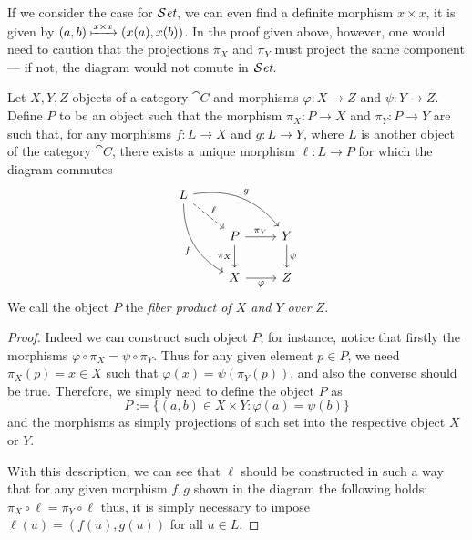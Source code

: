 If we consider the case for \({\mathcal{S}\textit{et}}\), we can even find a definite morphism \(x
\times x\), it is given by \((a, b) \xmapsto{x \times x} (x(a), x(b))\). In the
proof given above, however, one would need to caution that the projections
\(\pi_X\) and \(\pi_Y\) must project the same component --- if not, the diagram
would not comute in \({\mathcal{S}\textit{et}}\).

\begin{proposition}
   Let \(X, Y, Z\) objects of a category \(\cat C\) and morphisms \(\varphi :X
   \to Z\) and \(\psi : Y \to Z\). Define \(P\) to be an object such that the
   morphism  \(\pi_X : P \to X\) and  \(\pi_Y : P \to Y\) are such that, for any
   morphisms \(f : L \to X\) and  \(g : L \to Y\), where \(L\) is another object
   of the category \(\cat C\), there exists a unique morphism \(\ell: L \to P\)
   for which the diagram commutes
   \[
     \begin{tikzcd}
       L
       \ar[dr, dashed, "\ell"]
       \ar[drr, bend left, "g"]
       \ar[ddr, bend right, swap, "f"]
        &
          & \\
        &P
        \ar[r, "\pi_Y"]
        \ar[d, swap, "\pi_X"]
          &Y
          \ar[d, "\psi"]
          \\
        &X
        \ar[r, swap, "\varphi"]
          &Z
     \end{tikzcd}
   \]
   We call the object \(P\) the \emph{fiber product of \(X\) and \(Y\) over
   \(Z\)}.
\end{proposition}

\begin{proof}
   Indeed we can construct such object \(P\), for instance, notice that firstly
   the morphisms \(\varphi \circ \pi_X = \psi \circ \pi_Y\). Thus for any
   given element \(p \in P\), we need \(\pi_X(p) = x \in X\) such that
   \(\varphi(x) = \psi(\pi_Y(p))\), and also the converse should be true.
   Therefore, we simply need to define the object \(P\) as
   \[
      P := \{(a, b) \in X \times Y : \varphi(a) = \psi(b)\}
   \]
   and the morphisms as simply projections of such set into the respective
   object \(X\) or \(Y\).

   With this description, we can see that \(\ell\) should be constructed in such
   a way that for any given morphism \(f, g\) shown in the diagram the following
   holds: \(\pi_X \circ \ell = \pi_Y \circ \ell\) thus, it is simply necessary
   to impose \(\ell(u) = (f(u), g(u))\) for all \(u \in L\).
\end{proof}

